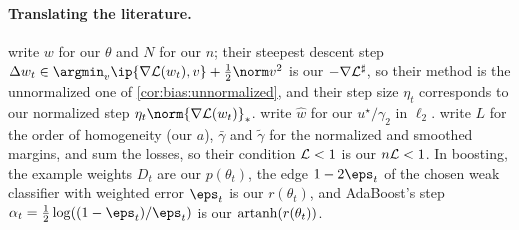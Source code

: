 \begin{refsection}
\paragraph{Translating the literature.} \Textcite{GunasekarEtAl2018} write $w$ for our $\theta$ and $N$ for our $n$; their steepest descent step $\Delta w_t\in\argmin_v\ip{\nabla\Loss(w_t),v}+\frac12\norm v^2$ is our $-\nabla\mathcal{L}^\sharp$, so their method is the unnormalized one of \cref{cor:bias:unnormalized}, and their step size $\eta_t$ corresponds to our normalized step $\eta_t\norm{\nabla\Loss(w_t)}_*$. \Textcite{SoudryEtAl2018} write $\hat w$ for our $u^\star/\gamma_2$ in $\ell_2$. \Textcite{LyuLi2020} write $L$ for the order of homogeneity (our $a$), $\bar\gamma$ and $\tilde\gamma$ for the normalized and smoothed margins, and sum the losses, so their condition $\mathcal{L}<1$ is our $n\mathcal{L}<1$. In boosting, the example weights $D_t$ are our $p(\theta_t)$, the edge $1-2\eps_t$ of the chosen weak classifier with weighted error $\eps_t$ is our $r(\theta_t)$, and AdaBoost's step $\alpha_t=\frac12\log((1-\eps_t)/\eps_t)$ is our $\operatorname{artanh}(r(\theta_t))$.

\printchapterbib
\end{refsection}
